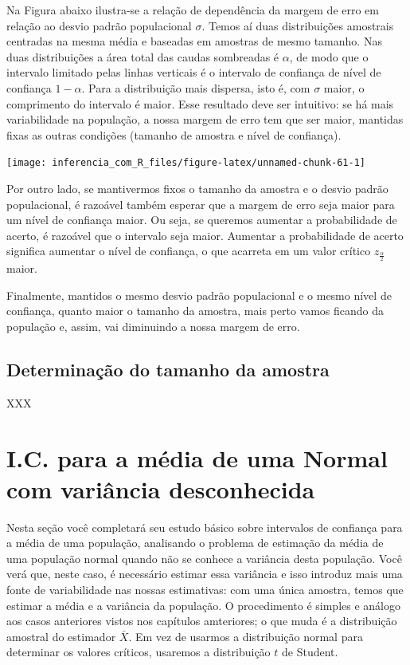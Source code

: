 \documentclass[
]{book}
\begin{document}
Na Figura abaixo ilustra-se a relação de dependência da margem de erro em relação ao desvio padrão populacional \(\sigma\). Temos aí duas distribuições amostrais centradas na mesma média e baseadas em amostras de mesmo tamanho. Nas duas distribuições a área total das caudas sombreadas é \(\alpha\), de modo que o intervalo limitado pelas linhas verticais é o intervalo de confiança de nível de confiança \(1-\alpha\). Para a distribuição mais dispersa, isto é, com \(\sigma\) maior, o comprimento do intervalo é maior. Esse resultado deve ser intuitivo: se há mais variabilidade na população, a nossa margem de erro tem que ser maior, mantidas fixas as outras condições (tamanho de amostra e nível de confiança).

\begin{center}\texttt{[image: inferencia\_com\_R\_files/figure-latex/unnamed-chunk-61-1]} \end{center}

Por outro lado, se mantivermos fixos o tamanho da amostra e o desvio padrão populacional, é razoável também esperar que a margem de erro seja maior para um nível de confiança maior. Ou seja, se queremos aumentar a probabilidade de acerto, é razoável que o intervalo seja maior. Aumentar a probabilidade de acerto significa aumentar o nível de confiança, o que acarreta em um valor crítico \(z_{\frac{\alpha}{2}}\) maior.

Finalmente, mantidos o mesmo desvio padrão populacional e o mesmo nível de confiança, quanto maior o tamanho da amostra, mais perto vamos ficando da população e, assim, vai diminuindo a nossa margem de erro.

\hypertarget{determinauxe7uxe3o-do-tamanho-da-amostra}{%
\subsection{Determinação do tamanho da amostra}\label{determinauxe7uxe3o-do-tamanho-da-amostra}}

XXX

\hypertarget{i.c.-para-a-muxe9dia-de-uma-normal-com-variuxe2ncia-desconhecida}{%
\section{I.C. para a média de uma Normal com variância desconhecida}\label{i.c.-para-a-muxe9dia-de-uma-normal-com-variuxe2ncia-desconhecida}}

Nesta seção você completará seu estudo básico sobre intervalos de confiança para a média de uma população, analisando o problema de estimação da média de uma população normal quando não se conhece a variância desta população. Você verá que, neste caso, é necessário estimar essa variância e isso introduz mais uma fonte de variabilidade nas nossas estimativas: com uma única amostra, temos que estimar a média e a variância da população. O procedimento é simples e análogo aos casos anteriores vistos nos capítulos amteriores; o que muda é a distribuição amostral do estimador \(\bar X\). Em vez de usarmos a distribuição normal para determinar os valores críticos, usaremos a distribuição \(t\) de Student.
\end{document}
